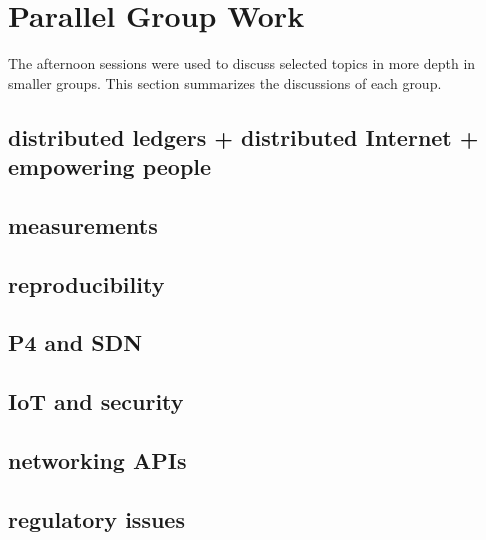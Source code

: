 \section{Parallel Group Work}\label{sec:parallel-group-work}

The afternoon sessions were used to discuss selected topics in more depth in
smaller groups. This section summarizes the discussions of each group.

\subsection{distributed ledgers + distributed Internet + empowering people}
\subsection{measurements}
\subsection{reproducibility}
\subsection{P4 and SDN}
\subsection{IoT and security}
\subsection{networking APIs}
\subsection{regulatory issues}
